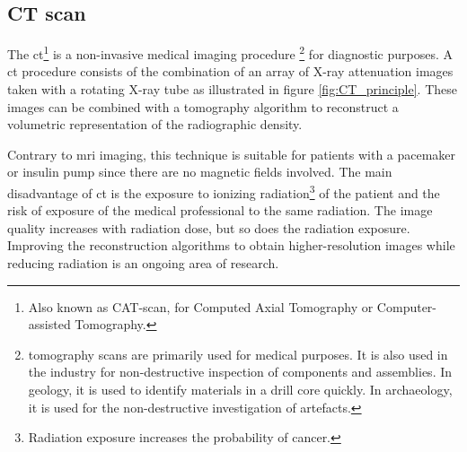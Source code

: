 \subsection{CT scan}
\par{
    The \acrfull{ct}\footnote{Also known as CAT-scan, for Computed Axial Tomography or Computer-assisted Tomography.} is a non-invasive medical imaging procedure
    \footnote{\Gls{tomography} scans are primarily used for medical purposes. 
    It is also used in the industry for non-destructive inspection of components and assemblies.
    In geology, it is used to identify materials in a drill core quickly. In archaeology, it is used for the non-destructive investigation of artefacts. } 
    for diagnostic purposes. 
    A \acrlong{ct} procedure consists of the combination of an array of X-ray attenuation images taken with a rotating X-ray tube as illustrated in figure \ref{fig:CT_principle}. 
    These images can be combined with a \Gls{tomography} algorithm to reconstruct a volumetric representation of the radiographic density.
}
\par{
    Contrary to \acrfull{mri} imaging, this technique is suitable for patients with a pacemaker or insulin pump since there are no magnetic fields involved.
    The main disadvantage of \acrshort{ct} is the exposure to ionizing radiation\footnote{Radiation exposure increases the probability of cancer.} of the patient and the risk of exposure of the medical professional to the same radiation.
    The image quality increases with radiation dose, but so does the radiation exposure.
    Improving the reconstruction algorithms to obtain higher-resolution images while reducing radiation is an ongoing area of research. 
}

